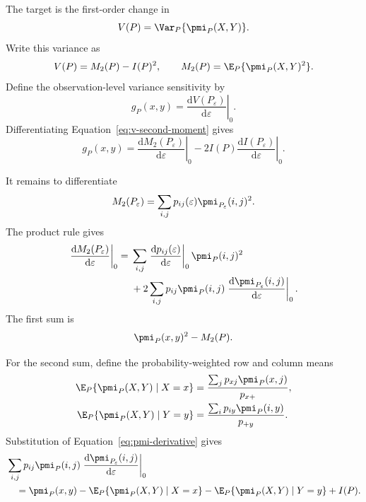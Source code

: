 The target is the first-order change in
\begin{equation}
  V(P)
  =\Var_P\{\pmi_P(X,Y)\}.
\end{equation}
Write this variance as
\begin{equation}
  V(P)=M_2(P)-I(P)^2,
  \qquad
  M_2(P)=\E_P\{\pmi_P(X,Y)^2\}.
  \label{eq:v-second-moment}
\end{equation}
Define the observation-level variance sensitivity by
\begin{equation}
  g_P(x,y)
  =
  \left.
  \frac{\mathrm d V(P_\varepsilon)}{\mathrm d\varepsilon}
  \right|_{0}.
  \label{eq:g-definition}
\end{equation}
Differentiating Equation~\eqref{eq:v-second-moment} gives
\begin{equation}
  g_P(x,y)
  =
  \left.\frac{\mathrm d M_2(P_\varepsilon)}{\mathrm d\varepsilon}
  \right|_{0}
  -2I(P)
  \left.\frac{\mathrm d I(P_\varepsilon)}{\mathrm d\varepsilon}
  \right|_{0}.
  \label{eq:g-decomposition}
\end{equation}

It remains to differentiate
\begin{equation}
  M_2(P_\varepsilon)
  =\sum_{i,j}p_{ij}(\varepsilon)
  \pmi_{P_\varepsilon}(i,j)^2.
\end{equation}
The product rule gives
\begin{align}
  \left.\frac{\mathrm d M_2(P_\varepsilon)}{\mathrm d\varepsilon}
  \right|_{0}
  ={}&
  \sum_{i,j}
  \left.\frac{\mathrm d p_{ij}(\varepsilon)}{\mathrm d\varepsilon}
  \right|_{0}
  \pmi_P(i,j)^2
  \notag\\
  &+
  2\sum_{i,j}p_{ij}\pmi_P(i,j)
  \left.\frac{\mathrm d\pmi_{P_\varepsilon}(i,j)}
  {\mathrm d\varepsilon}\right|_{0}.
  \label{eq:m2-product-rule}
\end{align}
The first sum is
\begin{equation}
  \pmi_P(x,y)^2-M_2(P).
  \label{eq:m2-weight-term}
\end{equation}

For the second sum, define the probability-weighted row and column means
\begin{align}
  \E_P\{\pmi_P(X,Y)\mid X=x\}
  &=\frac{\sum_j p_{xj}\pmi_P(x,j)}{p_{x+}},\\
  \E_P\{\pmi_P(X,Y)\mid Y=y\}
  &=\frac{\sum_i p_{iy}\pmi_P(i,y)}{p_{+y}}.
\end{align}
Substitution of Equation~\eqref{eq:pmi-derivative} gives
\begin{align}
  &\sum_{i,j}p_{ij}\pmi_P(i,j)
  \left.\frac{\mathrm d\pmi_{P_\varepsilon}(i,j)}
  {\mathrm d\varepsilon}\right|_{0}
  \notag\\
  &\quad=
  \pmi_P(x,y)
  -\E_P\{\pmi_P(X,Y)\mid X=x\}
  -\E_P\{\pmi_P(X,Y)\mid Y=y\}
  +I(P).
  \label{eq:m2-score-term}
\end{align}

